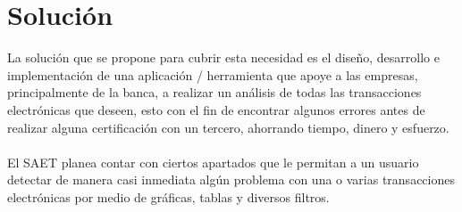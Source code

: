 \section{Solución}
La solución que se propone para cubrir esta necesidad es el diseño, desarrollo e implementación de una aplicación / herramienta que apoye a las empresas, principalmente de la banca, a realizar un análisis de todas las transacciones electrónicas que deseen, esto con el fin de encontrar algunos errores antes de realizar alguna certificación con un tercero, ahorrando tiempo, dinero y esfuerzo. 
\\ \\
El SAET planea contar con ciertos apartados que le permitan a un usuario detectar de manera casi inmediata algún problema con una o varias transacciones electrónicas por medio de gráficas, tablas y diversos filtros.